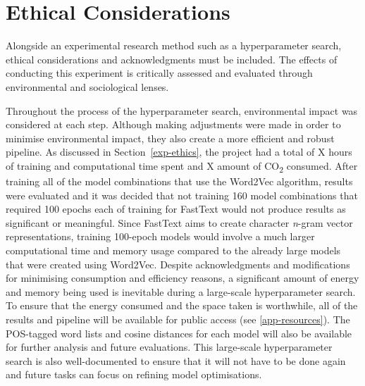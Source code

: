 \section{Ethical Considerations}
\label{sec:ethicalcons}

Alongside an experimental research method such as a hyperparameter search, ethical considerations and acknowledgments must be included. The effects of conducting this experiment is critically assessed and evaluated through environmental and sociological lenses.

Throughout the process of the hyperparameter search, environmental impact was considered at each step. Although making adjustments were made in order to minimise environmental impact, they also create a more efficient and robust pipeline. As discussed in Section~\ref{exp-ethics}, the project had a total of X hours of training and computational time spent and X amount of CO\textsubscript{2} consumed. After training all of the model combinations that use the Word2Vec algorithm, results were evaluated and it was decided that not training 160 model combinations that required 100 epochs each of training for FastText would not produce results as significant or meaningful. Since FastText aims to create character \emph{n}-gram vector representations, training 100-epoch models would involve a much larger computational time and memory usage compared to the already large models that were created using Word2Vec. Despite acknowledgments and modifications for minimising consumption and efficiency reasons, a significant amount of energy and memory being used is inevitable during a large-scale hyperparameter search. To ensure that the energy consumed and the space taken is worthwhile, all of the results and pipeline will be available for public access (see \autoref{app-resources}). The POS-tagged word lists and cosine distances for each model will also be available for further analysis and future evaluations. This large-scale hyperparameter search is also well-documented to ensure that it will not have to be done again and future tasks can focus on refining model optimisations. 

